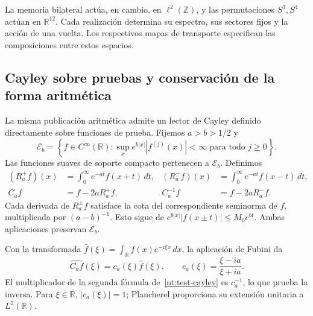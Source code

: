 \documentclass[a4paper,10pt]{article}
\theoremstyle{definition}\newtheorem{definition}[theorem]{Definición}
\theoremstyle{remark}\newtheorem{remark}[theorem]{Observación}
\numberwithin{equation}{section}
\begin{document}
La memoria bilateral actúa, en cambio, en
\(\ell^2(\mathbb Z)\), y las permutaciones \(S^3,S^4\)
actúan en \(\mathbb R^{12}\). Cada realización determina
su espectro, sus sectores fijos y la acción de una vuelta.
Los respectivos mapas de transporte especifican las
composiciones entre estos espacios.

\subsection{Cayley sobre pruebas y conservación de la forma aritmética}

La misma publicación aritmética admite un lector de Cayley
definido directamente sobre funciones de prueba. Fijemos
\(a>b>1/2\) y
\[
 \mathscr E_b=
 \left\{f\in C^\infty(\mathbb R):
   \sup_x e^{b|x|}|f^{(j)}(x)|<\infty
   \text{ para todo }j\geq0\right\}.
\]
Las funciones suaves de soporte compacto pertenecen a
\(\mathscr E_b\). Definimos
\begin{align}
 (R_a^+f)(x)&=\int_0^\infty e^{-at}f(x+t)\,dt,
 &(R_a^-f)(x)&=\int_0^\infty e^{-at}f(x-t)\,dt,\label{nt:resolvents}\\
 C_af&=f-2aR_a^+f,
 &C_a^{-1}f&=f-2aR_a^-f.\label{nt:test-cayley}
\end{align}
Cada derivada de \(R_a^\pm f\) satisface la cota del
correspondiente seminorma de \(f\), multiplicada por
\((a-b)^{-1}\). Esto sigue de
\(e^{b|x|}|f(x\pm t)|\leq M_0e^{bt}\).
Ambas aplicaciones preservan \(\mathscr E_b\).

Con la transformada
\(\widehat f(\xi)=\int_{\mathbb R}f(x)e^{-i\xi x}\,dx\),
la aplicación de Fubini da
\begin{equation}
 \widehat{C_af}(\xi)
 =c_a(\xi)\widehat f(\xi),\qquad
 c_a(\xi)=\frac{\xi-ia}{\xi+ia}.
 \label{nt:cayley-multiplier}
\end{equation}
El multiplicador de la segunda fórmula
de~\eqref{nt:test-cayley} es \(c_a^{-1}\), lo que prueba
la inversa. Para \(\xi\in\mathbb R\),
\(|c_a(\xi)|=1\); Plancherel proporciona su extensión
unitaria a \(L^2(\mathbb R)\).
\end{document}
